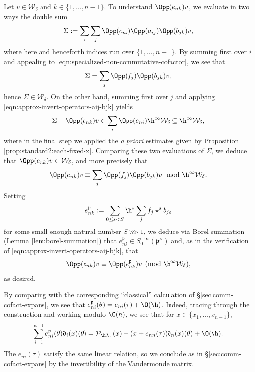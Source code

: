 Let $v \in \mathcal{W}_\delta$ and $k \in \{1, \dotsc, n-1\}$.  To understand $\Opp(e_{n k}) v$, we evaluate in two ways the double sum
\begin{equation*}
  \Sigma :=
  \sum_{i}
  \sum_{j}
  \Opp(e_{n i})
  \Opp(a_{i j})
  \Opp(b_{j k})
  v,
\end{equation*}
where here and henceforth indices run over $\{1, \dotsc, n-1\}$.  By summing first over $i$ and appealing to \eqref{eqn:specialized-non-commutative-cofactor}, we see that
\[
  \Sigma = \sum_j \Opp(f_j) \Opp(b_{j k}) v,
\]
hence $\Sigma \in \mathcal{W}_\delta$.  On the other hand, summing first over $j$ and applying \eqref{eqn:approx-invert-operators-aij-bjk} yields
\begin{equation*}
  \Sigma -
  \Opp(e_{n k})
  v
  \in
  \sum_{i} \Opp(e_{n i})
  \h^\infty \mathcal{W}_\delta
  \subseteq \h^\infty \mathcal{W}_\delta,
\end{equation*}
where in the final step we applied the \emph{a priori} estimates given by Proposition \ref{prop:standard2:each-fixed-x}.
Comparing these two evaluations of $\Sigma$, we deduce that $\Opp(e_{n k}) v \in \mathcal{W}_\delta$, and more precisely that
\[
  \Opp(e_{n k}) v \equiv \sum_{j} \Opp(f_j) \Opp(b_{j k}) v \mod{\h^\infty \mathcal{W}_\delta}.
\]
Setting
\[
  e_{n k}^{\mathfrak{p}} := \sum_{0 \leq s < S} \h^s \sum_j f_j \star^s b_{j k}
\]
for some small enough natural number $S \ggg 1$, we deduce via Borel summation (Lemma \ref{lem:borel-summation}) that $e_{n k} ^{\mathfrak{p}} \in S^{-\infty}_0(\mathfrak{p}^\wedge)$ and, as in the verification of \eqref{eqn:approx-invert-operators-aij-bjk}, that
\begin{equation*}
  \Opp(e_{n k}) v \equiv \Opp(e_{n k}^{\mathfrak{p}}) v \pmod{\h^\infty \mathcal{W}_\delta},
\end{equation*}
as desired.

By comparing with the corresponding ``classical'' calculation of \S\ref{sec:comm-cofact-expans}, we see that $e_{n i}^{\mathfrak{p}}(\theta) = e_{n i}(\tau) + \O(\h)$.  Indeed, tracing through the construction and working modulo $\O(h)$, we see that for $x \in \{x_1,\dotsc,x_{n-1}\}$,
\[
  \sum_{i=1}^{n-1} e_{n i }^{\mathfrak{p}}(\theta) \mathfrak{d}_i(x)(\theta) = \mathcal{P}_{\h \lambda_\pi}(x) - (x + e_{n n}(\tau)) \mathfrak{d}_n(x)(\theta) + \O(\h).
\]
The $e_{n i}(\tau)$ satisfy the same linear relation, so we conclude as in \S\ref{sec:comm-cofact-expans} by the invertibility of the Vandermonde matrix.

